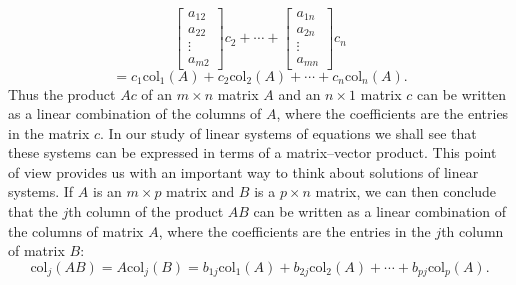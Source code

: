 \documentclass{report}
\begin{document}
\begin{itemize}
\[\begin{bmatrix}
                    a_{12} \\
                    a_{22} \\
                    \vdots \\
                    a_{m2}
                \end{bmatrix}
                c_2
                + \cdots +
                \begin{bmatrix}
                    a_{1n} \\
                    a_{2n} \\
                    \vdots \\
                    a_{mn}
                \end{bmatrix}
                c_n
            \]
            \[
                = c_1 \text{col}_1(A) + c_2 \text{col}_2(A) + \cdots + c_n \text{col}_n(A).
            \]
            \bigbreak \noindent 
            Thus the product $Ac$ of an $m \times n$ matrix $A$ and an $n \times 1$ matrix $c$ can be written as a linear combination of the columns of $A$, where the coefficients are the entries in the matrix $c$.
            \bigbreak \noindent 
            In our study of linear systems of equations we shall see that these systems can be expressed in terms of a matrix–vector product. This point of view provides us with an important way to think about solutions of linear systems.
            \bigbreak \noindent 
            If $A$ is an $m \times p$ matrix and $B$ is a $p \times n$ matrix, we can then conclude that the $j$th column of the product $AB$ can be written as a linear combination of the columns of matrix $A$, where the coefficients are the entries in the $j$th column of matrix $B$:
            \[
                \text{col}_j(AB) = A\text{col}_j(B) = b_{1j}\text{col}_1(A) + b_{2j}\text{col}_2(A) + \cdots + b_{pj}\text{col}_p(A).
            \]


\end{itemize}
\end{document}
